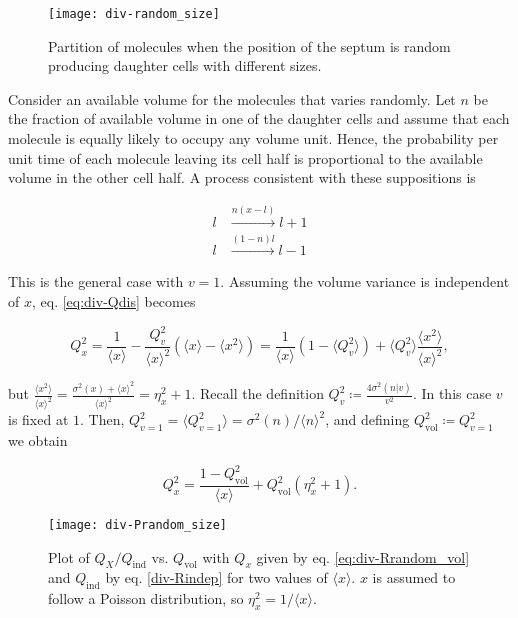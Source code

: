\begin{figure}[H]
  \centering
  \texttt{[image: div-random\_size]}
  \caption[Partition of molecules with random size of the daughter cells]{\label{fig:div-random_size}Partition of molecules when the position of the septum is random producing daughter cells with different sizes.}
\end{figure}

Consider an available volume for the molecules that varies randomly. Let $n$ be the fraction of available volume in one of the daughter cells and assume that each molecule is equally likely to occupy any volume unit. Hence, the probability per unit time of each molecule leaving its cell half is proportional to the available volume in the other cell half. A process consistent with these suppositions is

\begin{equation*}
  \begin{split}
    l&\xrightarrow{n(x-l)}l+1\\
    l&\xrightarrow{(1-n)l}l-1
  \end{split}
\end{equation*}

This is the general case with $v=1$. Assuming the volume variance is independent of $x$, eq. \eqref{eq:div-Qdis} becomes

\begin{equation*}
  Q_x^2 = \frac{1}{\langle x\rangle} - \frac{Q_v^2}{\langle x\rangle^2}\left(\langle x\rangle  - \langle x^2\rangle\right) = \frac{1}{\langle x\rangle}\left(1-\langle Q_v^2\rangle\right) + \langle Q_v^2\rangle\frac{\langle x^2\rangle}{\langle x\rangle^2},
\end{equation*}

but $\frac{\langle x^2\rangle}{\langle x\rangle^2} = \frac{\sigma^2(x) + \langle x\rangle^2}{\langle x\rangle^2} = \eta_x^2 + 1$. Recall the definition  $Q_v^2 \coloneqq \frac{4\sigma^2(n|v)}{v^2}$. In this case $v$ is fixed at $1$. Then, $Q_{v=1}^2 = \langle Q_{v=1}^2\rangle = \sigma^2(n)/\langle n\rangle^2$, and defining $Q^2_\text{vol}\coloneqq Q_{v=1}^2$ we obtain

\begin{equation}
  \label{eq:div-Rrandom_vol}
  Q_x^2 = \frac{1-Q_\text{vol}^2}{\langle x\rangle} + Q_\text{vol}^2(\eta^2_x+1).
\end{equation}

\begin{figure}[H]
  \centering
  \texttt{[image: div-Prandom\_size]}
  \caption[Partition noise when the sizes of the daughter cells are random]{\label{fig:div-Prandom_size}Plot of $Q_X/Q_\text{ind}$ vs. $Q_\text{vol}$ with $Q_x$ given by eq. \eqref{eq:div-Rrandom_vol} and $Q_\text{ind}$ by eq. \eqref{div-Rindep} for two values of $\langle x\rangle$. $x$ is assumed to follow a Poisson distribution, so $\eta_x^2=1/\langle x\rangle$.}
\end{figure}

